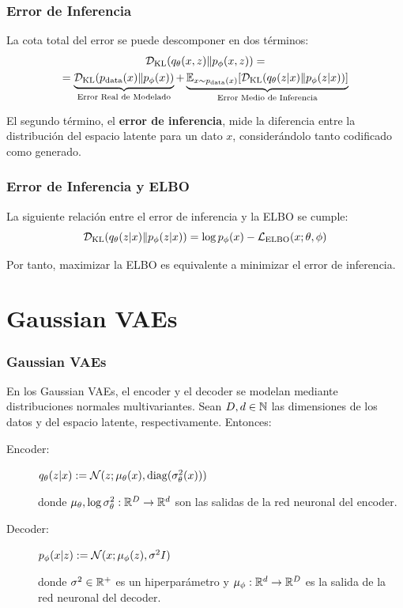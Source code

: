 \documentclass{beamer}
\begin{document}
\begin{frame}
    \frametitle{Error de Inferencia}

    La cota total del error se puede descomponer en dos términos:
    \begin{gather*}
        \mathcal{D}_{\text{KL}}(q_\theta(x, z)\| p_\phi(x, z)) =\\=
        \underbrace{\mathcal{D}_{\text{KL}}(p_{\text{data}}(x)\| p_\phi(x))}_{\text{Error Real de Modelado}} + 
        \underbrace{\mathbb{E}_{x\sim p_{\text{data}}(x)}[\mathcal{D}_{\text{KL}}(q_\theta(z|x)\| p_\phi(z|x))]}_{\text{Error Medio de Inferencia}}
    \end{gather*}\pause

    El segundo término, el \textbf{error de inferencia}, mide la diferencia entre la distribución del espacio latente para un dato $x$, considerándolo tanto codificado como generado.
\end{frame}

\begin{frame}
    \frametitle{Error de Inferencia y ELBO}

    La siguiente relación entre el error de inferencia y la ELBO se cumple:
    \begin{equation*}
        \mathcal{D}_{\text{KL}}(q_\theta(z|x)\| p_\phi(z|x)) = \log p_\phi(x) - \mathcal{L}_{\text{ELBO}}(x; \theta, \phi)
    \end{equation*}\pause

    Por tanto, maximizar la ELBO es equivalente a minimizar el error de inferencia.
\end{frame}

\section{Gaussian VAEs}

\begin{frame}
    \frametitle{Gaussian VAEs}

    En los Gaussian VAEs, el encoder y el decoder se modelan mediante distribuciones normales multivariantes. Sean $D, d\in \mathbb{N}$ las dimensiones de los datos y del espacio latente, respectivamente.\pause
    Entonces:
    \begin{description}
        \item[Encoder:] $q_\theta(z|x) := \mathcal{N}(z; \mu_\theta(x), \operatorname{diag}(\sigma_\theta^2(x)))$\\\vspace{0.2cm}
        
        donde $\mu_\theta, \log \sigma_\theta^2: \mathbb{R}^D \to \mathbb{R}^d$ son las salidas de la red neuronal del encoder.\pause

        \item[Decoder:] $p_\phi(x|z) := \mathcal{N}(x; \mu_\phi(z), \sigma^2 I)$\\\vspace{0.2cm}
        
        donde $\sigma^2\in \mathbb{R}^+$ es un hiperparámetro y $\mu_\phi: \mathbb{R}^d \to \mathbb{R}^D$ es la salida de la red neuronal del decoder.
    \end{description}
\end{frame}
\end{document}
